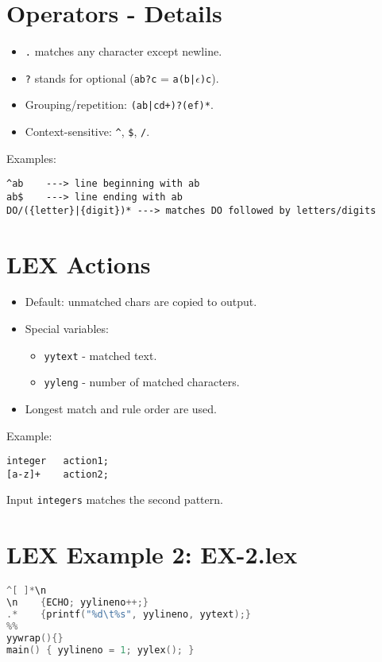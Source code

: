 \documentclass[12pt,a4paper]{article}
\begin{document}
\section*{Operators - Details}
\begin{itemize}
    \item \texttt{.} matches any character except newline.
    \item \texttt{?} stands for optional (\texttt{ab?c} = \texttt{a(b|\(\epsilon\))c}).
    \item Grouping/repetition: \texttt{(ab|cd+)?(ef)*}.
    \item Context-sensitive: \texttt{\^}, \texttt{\$}, \texttt{/}.
\end{itemize}

Examples:
\begin{verbatim}
^ab    ---> line beginning with ab
ab$    ---> line ending with ab
DO/({letter}|{digit})* ---> matches DO followed by letters/digits
\end{verbatim}

\section*{LEX Actions}
\begin{itemize}
    \item Default: unmatched chars are copied to output.
    \item Special variables:
    \begin{itemize}
        \item \texttt{yytext} - matched text.
        \item \texttt{yyleng} - number of matched characters.
    \end{itemize}
    \item Longest match and rule order are used.
\end{itemize}

Example:
\begin{verbatim}
integer   action1;
[a-z]+    action2;
\end{verbatim}
Input \texttt{integers} matches the second pattern.

\section*{LEX Example 2: EX-2.lex}
\begin{lstlisting}[language=C]
%%
^[ ]*\n
\n    {ECHO; yylineno++;}
.*    {printf("%d\t%s", yylineno, yytext);}
%%
yywrap(){}
main() { yylineno = 1; yylex(); }
\end{lstlisting}
\end{document}
